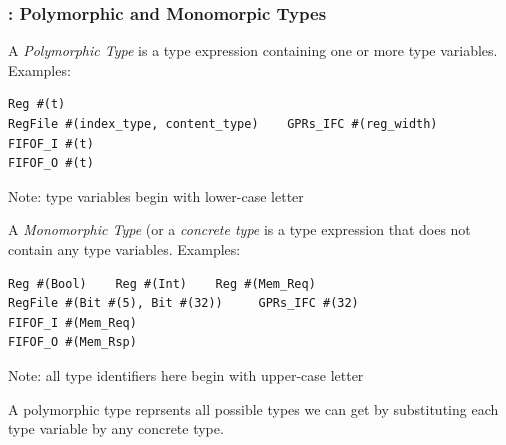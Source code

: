 \begin{frame}[fragile]
\frametitle{{\BSV}: Polymorphic and Monomorpic Types}

\footnotesize

A \emph{Polymorphic Type} is a type expression containing one or more
type variables. Examples:

\vspace{1ex}

\begin{center}
 \begin{minipage}{0.6\textwidth}
  \begin{Verbatim}[frame=single]
Reg #(t)
RegFile #(index_type, content_type)    GPRs_IFC #(reg_width)
FIFOF_I #(t)
FIFOF_O #(t)
  \end{Verbatim}
 \end{minipage}
 \begin{minipage}{0.35\textwidth}
  Note: type variables begin with lower-case letter
 \end{minipage}
\end{center}

\vspace{1ex}

A \emph{Monomorphic Type} (or a \emph{concrete type} is a type
expression that does not contain any type variables.  Examples:

\vspace{1ex}

\begin{center}
 \begin{minipage}{0.6\textwidth}
  \begin{Verbatim}[frame=single]
Reg #(Bool)    Reg #(Int)    Reg #(Mem_Req)
RegFile #(Bit #(5), Bit #(32))     GPRs_IFC #(32)
FIFOF_I #(Mem_Req)
FIFOF_O #(Mem_Rsp)
  \end{Verbatim}
 \end{minipage}
 \begin{minipage}{0.35\textwidth}
  Note: all type identifiers here begin with upper-case letter
 \end{minipage}
\end{center}

\vspace{1ex}

A polymorphic type reprsents all possible types we can get by
substituting each type variable by any concrete type.

\end{frame}


